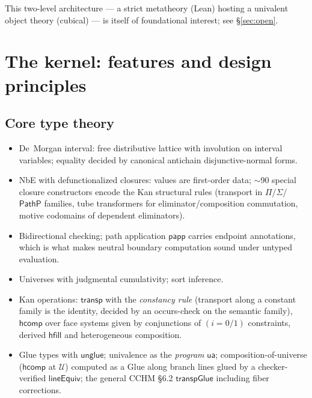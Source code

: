 \documentclass[11pt]{article}
\newcommand{\U}{\mathcal{U}}
\newcommand{\op}[1]{\ensuremath{\mathsf{#1}}}
\begin{document}
This two-level architecture --- a strict metatheory (Lean) hosting a
univalent object theory (cubical) --- is itself of foundational interest;
see \S\ref{sec:open}.

\section{The kernel: features and design principles}

\subsection{Core type theory}
\begin{itemize}[leftmargin=1.5em]
\item De~Morgan interval: free distributive lattice with involution on
interval variables; equality decided by canonical antichain
disjunctive-normal forms.
\item NbE with defunctionalized closures: values are first-order data;
$\sim$90 special closure constructors encode the Kan structural rules
(transport in $\Pi$/$\Sigma$/$\op{PathP}$ families, tube transformers for
eliminator/composition commutation, motive codomains of dependent
eliminators).
\item Bidirectional checking; path application $\op{papp}$ carries
endpoint annotations, which is what makes neutral boundary computation
sound under untyped evaluation.
\item Universes with judgmental cumulativity; sort inference.
\item Kan operations: $\op{transp}$ with the \emph{constancy rule}
(transport along a constant family is the identity, decided by an
occurs-check on the semantic family), $\op{hcomp}$ over face systems
given by conjunctions of $(i{=}0/1)$ constraints, derived $\op{hfill}$
and heterogeneous composition.
\item Glue types with $\op{unglue}$; univalence as the \emph{program}
$\op{ua}$; composition-of-universe ($\op{hcomp}$ at $\U$) computed as a
Glue along branch lines glued by a checker-verified $\op{lineEquiv}$; the
general CCHM \S6.2 $\op{transpGlue}$ including fiber corrections.
\end{itemize}
\end{document}
